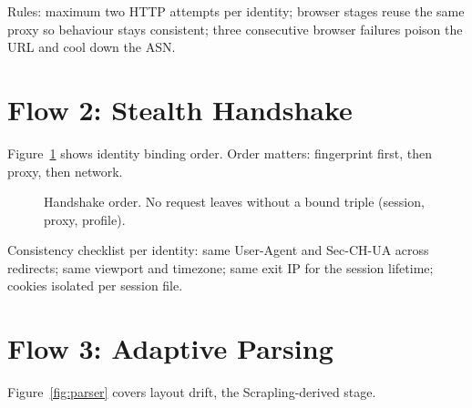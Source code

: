 \documentclass[11pt,a4paper]{article}
\begin{document}
Rules: maximum two HTTP attempts per identity; browser stages reuse the same proxy so behaviour stays consistent; three consecutive browser failures poison the URL and cool down the ASN.

\section{Flow 2: Stealth Handshake}
Figure~\ref{fig:handshake} shows identity binding order. Order matters: fingerprint first, then proxy, then network.

\begin{figure}[H]
\centering
{}
\caption{Handshake order. No request leaves without a bound triple (session, proxy, profile).}
\label{fig:handshake}
\end{figure}

Consistency checklist per identity: same User-Agent and Sec-CH-UA across redirects; same viewport and timezone; same exit IP for the session lifetime; cookies isolated per session file.

\section{Flow 3: Adaptive Parsing}
Figure~\ref{fig:parser} covers layout drift, the Scrapling-derived stage.
\end{document}

